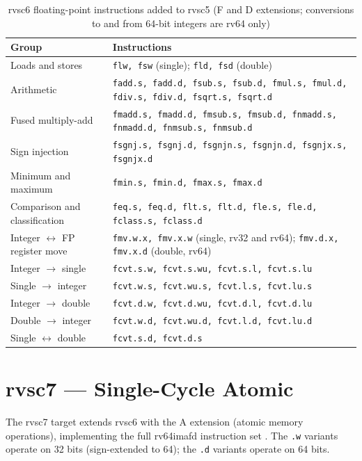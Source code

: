\begin{table}[htb]
\centering
\caption{rvsc6 floating-point instructions added to rvsc5 (F and D extensions; conversions to and
from 64-bit integers are rv64 only)}
\label{tab:rvsc6-isa}
\begin{tabular}{lp{9.6cm}}
\toprule
\textbf{Group} & \textbf{Instructions} \\
\midrule
Loads and stores & \texttt{flw, fsw} (single); \texttt{fld, fsd} (double) \\
Arithmetic & \texttt{fadd.s, fadd.d, fsub.s, fsub.d, fmul.s, fmul.d, fdiv.s, fdiv.d, fsqrt.s,
  fsqrt.d} \\
Fused multiply-add & \texttt{fmadd.s, fmadd.d, fmsub.s, fmsub.d, fnmadd.s, fnmadd.d, fnmsub.s,
  fnmsub.d} \\
Sign injection & \texttt{fsgnj.s, fsgnj.d, fsgnjn.s, fsgnjn.d, fsgnjx.s, fsgnjx.d} \\
Minimum and maximum & \texttt{fmin.s, fmin.d, fmax.s, fmax.d} \\
Comparison and classification & \texttt{feq.s, feq.d, flt.s, flt.d, fle.s, fle.d, fclass.s,
  fclass.d} \\
Integer $\leftrightarrow$ FP register move & \texttt{fmv.w.x, fmv.x.w} (single, rv32 and rv64);
  \texttt{fmv.d.x, fmv.x.d} (double, rv64) \\
Integer $\rightarrow$ single & \texttt{fcvt.s.w, fcvt.s.wu, fcvt.s.l, fcvt.s.lu} \\
Single $\rightarrow$ integer & \texttt{fcvt.w.s, fcvt.wu.s, fcvt.l.s, fcvt.lu.s} \\
Integer $\rightarrow$ double & \texttt{fcvt.d.w, fcvt.d.wu, fcvt.d.l, fcvt.d.lu} \\
Double $\rightarrow$ integer & \texttt{fcvt.w.d, fcvt.wu.d, fcvt.l.d, fcvt.lu.d} \\
Single $\leftrightarrow$ double & \texttt{fcvt.s.d, fcvt.d.s} \\
\bottomrule
\end{tabular}
\end{table}

\section{rvsc7 --- Single-Cycle Atomic}

The rvsc7 target extends rvsc6 with the A extension (atomic memory operations), implementing the full
rv64imafd instruction set \cite{riscv-spec}. The \texttt{.w} variants operate on 32 bits
(sign-extended to 64); the \texttt{.d} variants operate on 64 bits.

